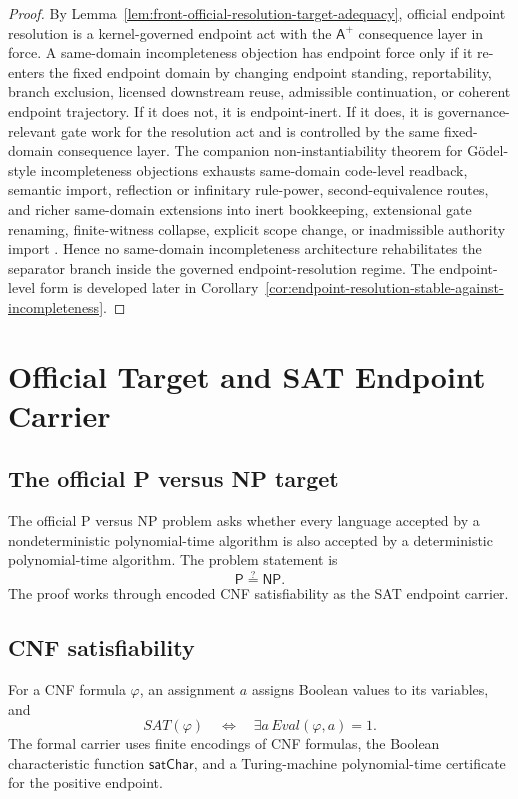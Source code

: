 \documentclass[11pt]{article}
\theoremstyle{definition}
\theoremstyle{remark}
\newcommand{\Aplus}{\mathsf{A}^{+}}
\newcommand{\Pclass}{\mathsf{P}}
\newcommand{\NPclass}{\mathsf{NP}}
\begin{document}
\begin{proof}
By Lemma~\ref{lem:front-official-resolution-target-adequacy}, official endpoint resolution is a kernel-governed endpoint act with the \(\Aplus\) consequence layer in force. A same-domain incompleteness objection has endpoint force only if it re-enters the fixed endpoint domain by changing endpoint standing, reportability, branch exclusion, licensed downstream reuse, admissible continuation, or coherent endpoint trajectory. If it does not, it is endpoint-inert. If it does, it is governance-relevant gate work for the resolution act and is controlled by the same fixed-domain consequence layer. The companion non-instantiability theorem for G\"odel-style incompleteness objections exhausts same-domain code-level readback, semantic import, reflection or infinitary rule-power, second-equivalence routes, and richer same-domain extensions into inert bookkeeping, extensional gate renaming, finite-witness collapse, explicit scope change, or inadmissible authority import \cite{GodelNonInstantiability}. Hence no same-domain incompleteness architecture rehabilitates the separator branch inside the governed endpoint-resolution regime. The endpoint-level form is developed later in Corollary~\ref{cor:endpoint-resolution-stable-against-incompleteness}.
\end{proof}

\section{Official Target and SAT Endpoint Carrier}

\subsection{The official P versus NP target}
The official P versus NP problem asks whether every language accepted by a nondeterministic polynomial-time algorithm is also accepted by a deterministic polynomial-time algorithm. The problem statement is
\[
  \Pclass \stackrel{?}{=} \NPclass.
\]
The proof works through encoded CNF satisfiability as the SAT endpoint carrier.

\subsection{CNF satisfiability}
For a CNF formula \(\varphi\), an assignment \(a\) assigns Boolean values to its variables, and
\[
  SAT(\varphi) \quad\Longleftrightarrow\quad \exists a\, Eval(\varphi,a)=1.
\]
The formal carrier uses finite encodings of CNF formulas, the Boolean characteristic function \(\mathsf{satChar}\), and a Turing-machine polynomial-time certificate for the positive endpoint.
\end{document}

